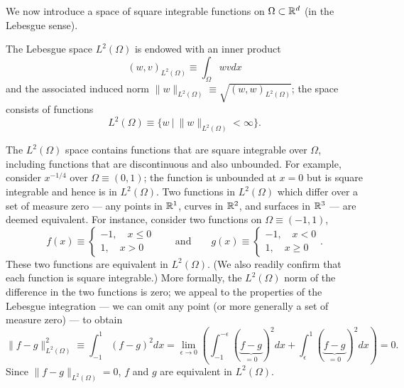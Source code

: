 We now introduce a space of square integrable functions on $\Omega \subset \mathbb{R}^d$ (in the Lebesgue sense).
\begin{definition}
  The Lebesgue space $L^2(\Omega)$ is endowed with an inner product
  \begin{equation*}
    (w,v)_{L^2(\Omega)} \equiv \int_\Omega w v dx
  \end{equation*}
  and the associated induced norm $\| w \|_{L^2(\Omega)} \equiv \sqrt{(w,w)_{L^2(\Omega)}}$; the space consists of functions
  \begin{equation*}
    L^2(\Omega) \equiv \{ w \ | \ \| w \|_{L^2(\Omega)} < \infty \}.
  \end{equation*}
\end{definition}
The $L^2(\Omega)$ space contains functions that are square integrable over $\Omega$, including functions that are discontinuous and also unbounded.  For example, consider $x^{-1/4}$ over $\Omega \equiv (0,1)$; the function is unbounded at $x = 0$ but is square integrable and hence is in $L^2(\Omega)$.   Two functions in $L^2(\Omega)$ which differ over a set of measure zero --- any points in $\mathbb{R}^1$, curves in $\mathbb{R}^2$, and surfaces in $\mathbb{R}^3$ --- are deemed equivalent. For instance, consider two functions on $\Omega \equiv (-1,1)$,
\begin{equation*}
  f(x) \equiv \begin{cases}
    -1, \quad x \leq 0 \\
    1, \quad x > 0
  \end{cases}
  \qquad \text{and} \qquad
  g(x) \equiv \begin{cases}
    -1, \quad x < 0 \\
    1, \quad x \geq 0
  \end{cases}.
\end{equation*}
These two functions are equivalent in $L^2(\Omega)$.  (We also readily confirm that each function is square integrable.) More formally, the $L^2(\Omega)$ norm of the difference in the two functions is zero; we appeal to the properties of the Lebesgue integration --- we can omit any point (or more generally a set of measure zero) --- to obtain
\begin{equation*}
  \| f - g \|^2_{L^2(\Omega)} \equiv \int_{-1}^1 (f - g)^2 dx =
  \lim_{\epsilon \to 0}
  (\int_{-1}^{-\epsilon} (\underbrace{f - g}_{=0})^2 dx + \int_{\epsilon}^{1} (\underbrace{f - g}_{=0})^2 dx )
  =0.
\end{equation*}
Since $\| f - g \|_{L^2(\Omega)} = 0$,  $f$ and $g$ are equivalent in $L^2(\Omega)$.

